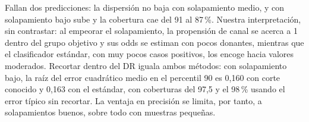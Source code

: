Fallan dos predicciones: la dispersión no baja con solapamiento medio, y con solapamiento bajo sube y la cobertura cae del 91 al 87\,\%. Nuestra interpretación, sin contrastar: al empeorar el solapamiento, la propensión de canal se acerca a 1 dentro del grupo objetivo y sus odds se estiman con pocos donantes, mientras que el clasificador estándar, con muy pocos casos positivos, los encoge hacia valores moderados. Recortar dentro del DR iguala ambos métodos: con solapamiento bajo, la raíz del error cuadrático medio en el percentil 90 es 0,160 con corte conocido y 0,163 con el estándar, con coberturas del 97,5 y el 98\,\% usando el error típico sin recortar. La ventaja en precisión se limita, por tanto, a solapamientos buenos, sobre todo con muestras pequeñas.
